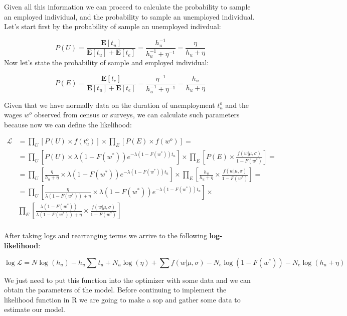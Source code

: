 \documentclass[]{book}
\begin{document}
Given all this information we can proceed to calculate the probability
to sample an employed individual, and the probability to sample an
unemployed individual. Let's start first by the probability of sample an
unemployed indivdual:

\[P(U)=\frac{\mathbf{E}[t_u]}{\mathbf{E}[t_u]+\mathbf{E}[t_e]}=\frac{h_u^{-1}}{h_u^{-1}+\eta^{-1}}=\frac{\eta}{h_u+\eta}\]
Now let's state the probability of sample and employed individual:

\[P(E)=\frac{\mathbf{E}[t_e]}{\mathbf{E}[t_u]+\mathbf{E}[t_e]}=\frac{\eta^{-1}}{h_u^{-1}+\eta^{-1}}=\frac{h_u}{h_u+\eta}\]

Given that we have normally data on the duration of unemployment
\(t_u^o\) and the wages \(w^o\) observed from census or surveys, we can
calculate such parameters because now we can define the likelihood:

\begin{equation}
\begin{aligned}
\mathcal{L}&=\prod_U [P(U) \times f(t_u^o)]\times \prod_E [P(E) \times f(w^o)]=\\
&= \prod_U\left[ P(U) \times \lambda (1- F(w^*)) e^{- \lambda (1- F(w^*)) t_u} \right] \times \prod_E \left[P(E) \times \frac{f(w|\mu, \sigma)}{1 - F(w^*)} \right]=\\
&=  \prod_U\left[\frac{\eta}{h_u+\eta}  \times \lambda (1- F(w^*)) e^{- \lambda (1- F(w^*)) t_u} \right] \times \prod_E \left[\frac{h_u}{h_u+\eta} \times \frac{f(w|\mu, \sigma)}{1 - F(w^*)} \right]=\\
&=  \prod_U\left[\frac{\eta}{\lambda (1- F(w^*))+\eta}  \times \lambda (1- F(w^*)) e^{- \lambda (1- F(w^*)) t_u} \right] \times\\
&\prod_E \left[\frac{\lambda (1- F(w^*))}{\lambda (1- F(w^*))+\eta} \times \frac{f(w|\mu, \sigma)}{1 - F(w^*)} \right]\\
\end{aligned}
\end{equation}

After taking logs and rearranging terms we arrive to the following
\textbf{log-likelihood}:

\[\log \mathcal{L} = N \log(h_u) - h_u \sum t_u + N_u \log(\eta) + \sum f(w|\mu,\sigma) -  N_e \log(1-F(w^*))  - N_e \log(h_u + \eta)\]

We just need to put this function into the optimizer with some data and
we can obtain the parameters of the model. Before continuing to
implement the likelihood function in R we are going to make a sop and
gather some data to estimate our model.
\end{document}
